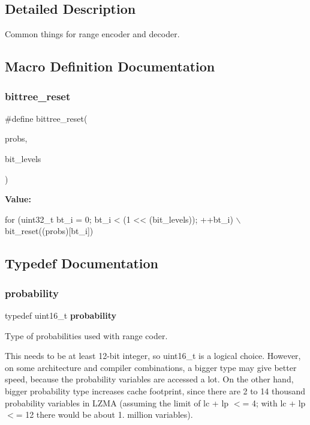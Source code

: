\subsection{Detailed Description}
Common things for range encoder and decoder. 



\subsection{Macro Definition Documentation}
\mbox{\label{range__common_8h_a3178e633d96644afeaac8bbd3d78003a}} 
\subsubsection{bittree\+\_\+reset}
{\footnotesize\ttfamily \#define bittree\+\_\+reset(\begin{DoxyParamCaption}\item[{}]{probs,  }\item[{}]{bit\+\_\+levels }\end{DoxyParamCaption})}

{\bfseries Value\+:}
\begin{DoxyCode}
\textcolor{keywordflow}{for} (uint32\_t bt\_i = 0; bt\_i < (1 << (bit\_levels)); ++bt\_i) \(\backslash\)
                bit\_reset((probs)[bt\_i])
\end{DoxyCode}


\subsection{Typedef Documentation}
\mbox{\label{range__common_8h_a34c0f9a451832941a8aa04aa8e085efa}} 
\subsubsection{probability}
{\footnotesize\ttfamily typedef uint16\+\_\+t \textbf{ probability}}



Type of probabilities used with range coder. 

This needs to be at least 12-\/bit integer, so uint16\+\_\+t is a logical choice. However, on some architecture and compiler combinations, a bigger type may give better speed, because the probability variables are accessed a lot. On the other hand, bigger probability type increases cache footprint, since there are 2 to 14 thousand probability variables in L\+Z\+MA (assuming the limit of lc + lp $<$= 4; with lc + lp $<$= 12 there would be about 1. million variables).

